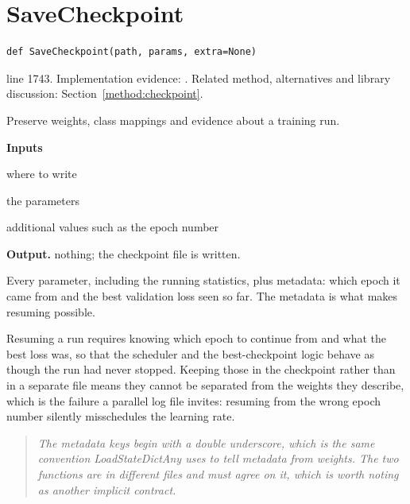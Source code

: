 \section{SaveCheckpoint}\label{fn:train:SaveCheckpoint}
\begin{lstlisting}[style=sig]
def SaveCheckpoint(path, params, extra=None)
\end{lstlisting}
 line 1743. Implementation evidence: \cite{code2026}. Related method, alternatives and library discussion: Section~\ref{method:checkpoint}.


Preserve weights, class mappings and evidence about a training run.




\noindent\textbf{Inputs}
\begin{description}[leftmargin=2.2em,style=nextline,font=\normalfont\ttfamily]\setlength\itemsep{1pt}
  \item[{path}] \normalfont where to write
  \item[{params}] \normalfont the parameters
  \item[{extra}] \normalfont additional values such as the epoch number
\end{description}

\noindent\textbf{Output.} nothing; the checkpoint file is written.


Every parameter, including the running statistics, plus metadata: which epoch it came from and the best validation loss seen so far. The metadata is what makes resuming possible.


Resuming a run requires knowing which epoch to continue from and what the best loss was, so that the scheduler and the best-checkpoint logic behave as though the run had never stopped. Keeping those in the checkpoint rather than in a separate file means they cannot be separated from the weights they describe, which is the failure a parallel log file invites: resuming from the wrong epoch number silently misschedules the learning rate.


\begin{quote}\small\itshape The metadata keys begin with a double underscore, which is the same convention LoadStateDictAny uses to tell metadata from weights. The two functions are in different files and must agree on it, which is worth noting as another implicit contract.\end{quote}


